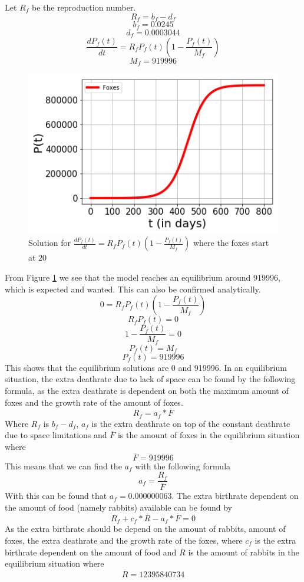 \documentclass{article}
\begin{document}
Let $R_f$ be the reproduction number.
$$R_f = b_f - d_f$$
$$b_f = 0.0245$$
$$d_f = 0.0003044$$
$$\frac{dP_f(t)}{dt} = R_fP_f(t)(1-\frac{P_f(t)}{M_f})$$
$$M_f = 919996$$
\begin{figure}[h!]
    \centering
    \includegraphics[scale=0.78]{Pictures/Foxes.png}
    \caption{Solution for $\frac{dP_f(t)}{dt} = R_fP_f(t)(1-\frac{P_f(t)}{M_f})$ where the foxes start at $20$}
    \label{fig:Foxes}
\end{figure}
From Figure \ref{fig:Foxes} we see that the model reaches an equilibrium around 919996, which is expected and wanted. This can also be confirmed analytically.
$$0=R_fP_f(t)(1-\frac{P_f(t)}{M_f})$$
$$R_fP_f(t)=0$$
$$1-\frac{P_f(t)}{M_f}=0$$
$$P_f(t)=M_f$$
$$P_f(t)=919996$$
This shows that the equilibrium solutions are 0 and 919996. In an equilibrium situation, the extra deathrate due to lack of space can be found by the following formula, as the extra deathrate is dependent on both the maximum amount of foxes and the growth rate of the amount of foxes.
$$R_f = a_f * \overline{F}$$
Where $R_f$ is $b_f-d_f$, $a_f$ is the extra deathrate on top of the constant deathrate due to space limitations and $\overline{F}$ is the amount of foxes in the equilibrium situation where
$$\overline{F} = 919996$$
This means that we can find the $a_f$ with the following formula
$$a_f = \frac{R_f}{\overline{F}}$$
With this can be found that $a_f = 0.000000063$. The extra birthrate dependent on the amount of food (namely rabbits) available can be found by
$$R_f + c_f*\overline{R}-a_f*\overline{F}=0$$
As the extra birthrate should be depend on the amount of rabbits, amount of foxes, the extra deathrate and the growth rate of the foxes, where $c_f$ is the extra birthrate dependent on the amount of food and $\overline{R}$ is the amount of rabbits in the equilibrium situation where
$$\overline{R}=12395840734$$
\end{document}
